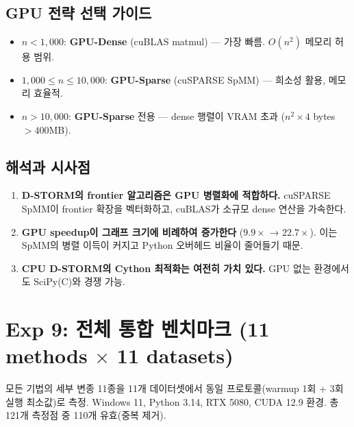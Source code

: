 \documentclass[11pt,a4paper]{article}
\begin{document}
\subsection{GPU 전략 선택 가이드}

\begin{tcolorbox}[colback=purple!5, colframe=purple!50!black, title=GPU 전략 선택]
\begin{itemize}
  \item $n < 1{,}000$: \textbf{GPU-Dense} (cuBLAS matmul) --- 가장 빠름. $O(n^2)$ 메모리 허용 범위.
  \item $1{,}000 \leq n \leq 10{,}000$: \textbf{GPU-Sparse} (cuSPARSE SpMM) --- 희소성 활용, 메모리 효율적.
  \item $n > 10{,}000$: \textbf{GPU-Sparse} 전용 --- dense 행렬이 VRAM 초과 ($n^2 \times 4$ bytes $> 400$MB).
\end{itemize}
\end{tcolorbox}

\subsection{해석과 시사점}

\begin{tcolorbox}[colback=purple!5, colframe=purple!50!black, title=GPU 가속 핵심 결론]
\begin{enumerate}
  \item \textbf{D-STORM의 frontier 알고리즘은 GPU 병렬화에 적합하다.} cuSPARSE SpMM이 frontier 확장을 벡터화하고, cuBLAS가 소규모 dense 연산을 가속한다.
  \item \textbf{GPU speedup이 그래프 크기에 비례하여 증가한다} ($9.9\times$ → $22.7\times$). 이는 SpMM의 병렬 이득이 커지고 Python 오버헤드 비율이 줄어들기 때문.
  \item \textbf{CPU D-STORM의 Cython 최적화는 여전히 가치 있다.} GPU 없는 환경에서도 SciPy(C)와 경쟁 가능.
\end{enumerate}
\end{tcolorbox}

\section{Exp 9: 전체 통합 벤치마크 (11 methods $\times$ 11 datasets)}

모든 기법의 세부 변종 11종을 11개 데이터셋에서 동일 프로토콜(warmup 1회 + 3회 실행 최소값)로 측정. Windows 11, Python 3.14, RTX 5080, CUDA 12.9 환경. 총 121개 측정점 중 110개 유효(중복 제거).
\end{document}
